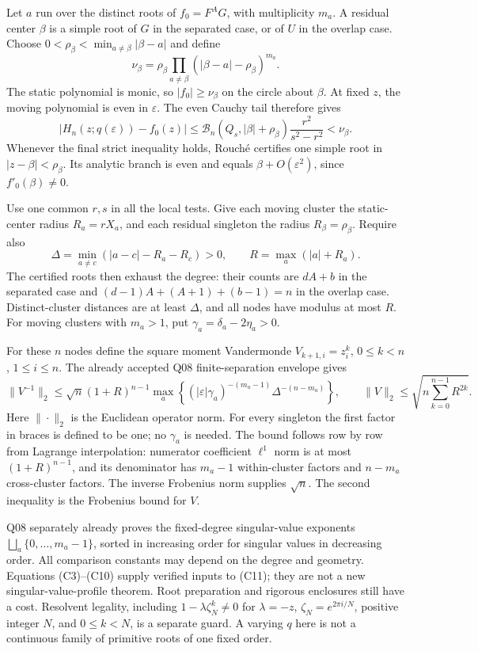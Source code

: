 \documentclass[
  11pt,
]{article}
\begin{document}
Let \(a\) run over the distinct roots of \(f_0=F^AG\), with
multiplicity \(m_a\). A residual center \(\beta\) is a simple root of
\(G\) in the separated case, or of \(U\) in the overlap case. Choose
\(0<\rho_\beta<\min_{a\ne\beta}|\beta-a|\) and define
\[
\nu_\beta=\rho_\beta\prod_{a\ne\beta}
 (|\beta-a|-\rho_\beta)^{m_a}.
\]
The static polynomial is monic, so \(|f_0|\geq\nu_\beta\) on the
circle about \(\beta\). At fixed \(z\), the moving polynomial is even
in \(\varepsilon\). The even Cauchy tail therefore gives
\[
|H_n(z;q(\varepsilon))-f_0(z)|
\leq\mathcal B_n(Q_s,|\beta|+\rho_\beta)\frac{r^2}{s^2-r^2}
<\nu_\beta. \tag{C9}
\]
Whenever the final strict inequality holds, Rouch\'e certifies one
simple root in \(|z-\beta|<\rho_\beta\). Its analytic branch is even
and equals \(\beta+O(\varepsilon^2)\), since \(f'_0(\beta)\ne0\).

Use one common \(r,s\) in all the local tests. Give each moving cluster
the static-center radius \(R_a=rX_a\), and each residual singleton
the radius \(R_\beta=\rho_\beta\). Require also
\[
\Delta=\min_{a\ne c}(|a-c|-R_a-R_c)>0,
\qquad R=\max_a(|a|+R_a). \tag{C10}
\]
The certified roots then exhaust the degree: their counts are
\(dA+b\) in the separated case and
\((d-1)A+(A+1)+(b-1)=n\) in the overlap case. Distinct-cluster
distances are at least \(\Delta\), and all nodes have modulus at most
\(R\). For moving clusters with \(m_a>1\), put
\(\gamma_a=\delta_a-2\eta_a>0\).

For these \(n\) nodes define the square moment Vandermonde
\(V_{k+1,i}=z_i^k\), \(0\leq k<n\), \(1\leq i\leq n\).
The already accepted Q08 finite-separation envelope gives
\[
\|V^{-1}\|_2\leq\sqrt n(1+R)^{n-1}
\max_a\left\{(|\varepsilon|\gamma_a)^{-(m_a-1)}
                    \Delta^{-(n-m_a)}\right\},
\qquad
\|V\|_2\leq\sqrt{n\sum_{k=0}^{n-1}R^{2k}}.
\tag{C11}
\]
Here \(\|\cdot\|_2\) is the Euclidean operator norm. For every
singleton the first factor in braces is defined to be one; no
\(\gamma_a\) is needed. The bound follows row by row from Lagrange
interpolation: numerator coefficient \(\ell^1\) norm is at most
\((1+R)^{n-1}\), and its denominator has \(m_a-1\) within-cluster
factors and \(n-m_a\) cross-cluster factors. The inverse Frobenius
norm supplies \(\sqrt n\). The second inequality is the Frobenius
bound for \(V\).

Q08 separately already proves the fixed-degree singular-value exponents
\(\bigsqcup_a\{0,\ldots,m_a-1\}\), sorted in increasing order for
singular values in decreasing order. All comparison constants may
depend on the degree and geometry. Equations (C3)--(C10) supply verified
inputs to (C11); they are not a new singular-value-profile theorem.
Root preparation and rigorous enclosures still have a cost. Resolvent
legality, including \(1-\lambda\zeta_N^k\ne0\) for
\(\lambda=-z\), \(\zeta_N=e^{2\pi i/N}\), positive integer \(N\),
and \(0\leq k<N\), is a separate guard. A varying \(q\) here is not
a continuous family of primitive roots of one fixed order.
\end{document}
